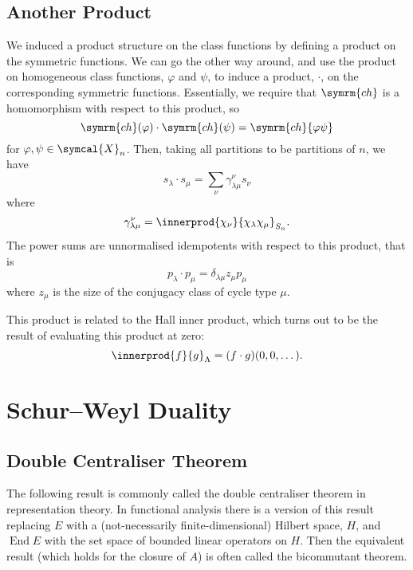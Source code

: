 \documentclass[fleqn]{NotesClass}
\DeclareMathOperator{\End}{End}
\newcommand{\classFunctions}{\symcal{X}}
\newcommand{\ch}{\symrm{ch}}
\begin{document}
    \section{Another Product}
    We induced a product structure on the class functions by defining a product on the symmetric functions.
    We can go the other way around, and use the product on homogeneous class functions, \(\varphi\) and \(\psi\), to induce a product, \(\cdot\), on the corresponding symmetric functions.
    Essentially, we require that \(\ch\) is a homomorphism with respect to this product, so
    \begin{equation}
        \ch(\varphi) \cdot \ch(\psi) = \ch{\varphi \psi}
    \end{equation}
    for \(\varphi, \psi \in \classFunctions_n\).
    Then, taking all partitions to be partitions of \(n\), we have
    \begin{equation}
        s_\lambda \cdot s_\mu = \sum_\nu \gamma^\nu_{\lambda\mu} s_\nu
    \end{equation}
    where
    \begin{equation}
        \gamma^\nu_{\lambda\mu} = \innerprod{\chi_\nu}{\chi_\lambda \chi_\mu}_{S_n}.
    \end{equation}
    The power sums are unnormalised idempotents with respect to this product, that is
    \begin{equation}
        p_\lambda \cdot p_\mu = \delta_{\lambda\mu} z_\mu p_\mu
    \end{equation}
    where \(z_\mu\) is the size of the conjugacy class of cycle type \(\mu\).
    
    This product is related to the Hall inner product, which turns out to be the result of evaluating this product at zero:
    \begin{equation}
        \innerprod{f}{g}_{\Lambda} = (f \cdot g)(0, 0, \dotsc).
    \end{equation}
    
    \chapter{Schur--Weyl Duality}
    \section{Double Centraliser Theorem}
    \begin{remark}{}{}
        The following result is commonly called the double centraliser theorem in representation theory.
        In functional analysis there is a version of this result replacing \(E\) with a (not-necessarily finite-dimensional) Hilbert space, \(H\), and \(\End E\) with the set space of bounded linear operators on \(H\).
        Then the equivalent result (which holds for the closure of \(A\)) is often called the bicommutant theorem.
    \end{remark}
    
\end{document}
